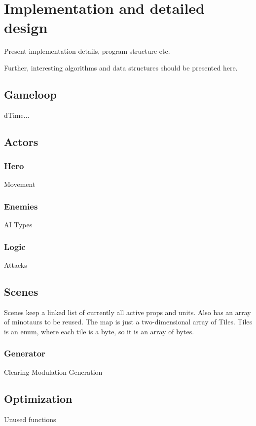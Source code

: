 \chapter{Implementation and detailed design}

Present implementation details, program structure etc.

Further, interesting algorithms and data structures should be presented here.

\section{Gameloop}
dTime...\\

\section{Actors}
\subsection{Hero}
Movement
\subsection{Enemies}
AI
Types

\subsection{Logic}
Attacks

\section{Scenes}
Scenes keep a linked list of currently all active props and units.
Also has an array of minotaurs to be reused.
The map is just a two-dimensional array of Tiles. Tiles is an enum, where each tile is a byte, so it is an array of bytes.
\subsection{Generator}
Clearing
Modulation
Generation

\section{Optimization}
Unused functions

